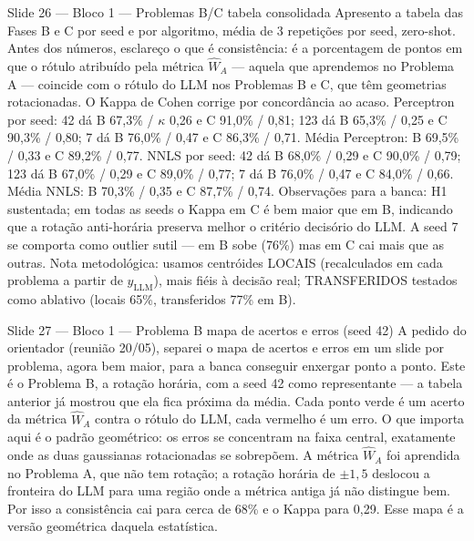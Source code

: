 \documentclass[aspectratio=169,10pt]{beamer}
\begin{document}
\begin{frame}{Slide 26 --- Bloco 1 --- Problemas B/C tabela consolidada}
\footnotesize
Apresento a tabela das Fases B e C por seed e por algoritmo, m\'edia de 3 repeti\c{c}\~oes por seed, zero-shot. Antes dos n\'umeros, esclare\c{c}o o que \'e consist\^encia: \'e a porcentagem de pontos em que o r\'otulo atribu\'ido pela m\'etrica $\hat W_A$ --- aquela que aprendemos no Problema A --- coincide com o r\'otulo do LLM nos Problemas B e C, que t\^em geometrias rotacionadas. O Kappa de Cohen corrige por concord\^ancia ao acaso. Perceptron por seed: 42 d\'a B 67,3\% / $\kappa$ 0,26 e C 91,0\% / 0,81; 123 d\'a B 65,3\% / 0,25 e C 90,3\% / 0,80; 7 d\'a B 76,0\% / 0,47 e C 86,3\% / 0,71. M\'edia Perceptron: B 69,5\% / 0,33 e C 89,2\% / 0,77. NNLS por seed: 42 d\'a B 68,0\% / 0,29 e C 90,0\% / 0,79; 123 d\'a B 67,0\% / 0,29 e C 89,0\% / 0,77; 7 d\'a B 76,0\% / 0,47 e C 84,0\% / 0,66. M\'edia NNLS: B 70,3\% / 0,35 e C 87,7\% / 0,74. Observa\c{c}\~oes para a banca: H1 sustentada; em todas as seeds o Kappa em C \'e bem maior que em B, indicando que a rota\c{c}\~ao anti-hor\'aria preserva melhor o crit\'erio decis\'orio do LLM. A seed 7 se comporta como outlier sutil --- em B sobe (76\%) mas em C cai mais que as outras. Nota metodol\'ogica: usamos centr\'oides LOCAIS (recalculados em cada problema a partir de $y_{\text{LLM}}$), mais fi\'eis \`a decis\~ao real; TRANSFERIDOS testados como ablativo (locais 65\%, transferidos 77\% em B).
\end{frame}

\begin{frame}{Slide 27 --- Bloco 1 --- Problema B mapa de acertos e erros (seed 42)}
\footnotesize
A pedido do orientador (reuni\~ao 20/05), separei o mapa de acertos e erros em um slide por problema, agora bem maior, para a banca conseguir enxergar ponto a ponto. Este \'e o Problema B, a rota\c{c}\~ao hor\'aria, com a seed 42 como representante --- a tabela anterior j\'a mostrou que ela fica pr\'oxima da m\'edia. Cada ponto verde \'e um acerto da m\'etrica $\hat W_A$ contra o r\'otulo do LLM, cada vermelho \'e um erro. O que importa aqui \'e o padr\~ao geom\'etrico: os erros se concentram na faixa central, exatamente onde as duas gaussianas rotacionadas se sobrep\~oem. A m\'etrica $\hat W_A$ foi aprendida no Problema A, que n\~ao tem rota\c{c}\~ao; a rota\c{c}\~ao hor\'aria de $\pm 1{,}5$ deslocou a fronteira do LLM para uma regi\~ao onde a m\'etrica antiga j\'a n\~ao distingue bem. Por isso a consist\^encia cai para cerca de 68\% e o Kappa para 0,29. Esse mapa \'e a vers\~ao geom\'etrica daquela estat\'istica.
\end{frame}
\end{document}

